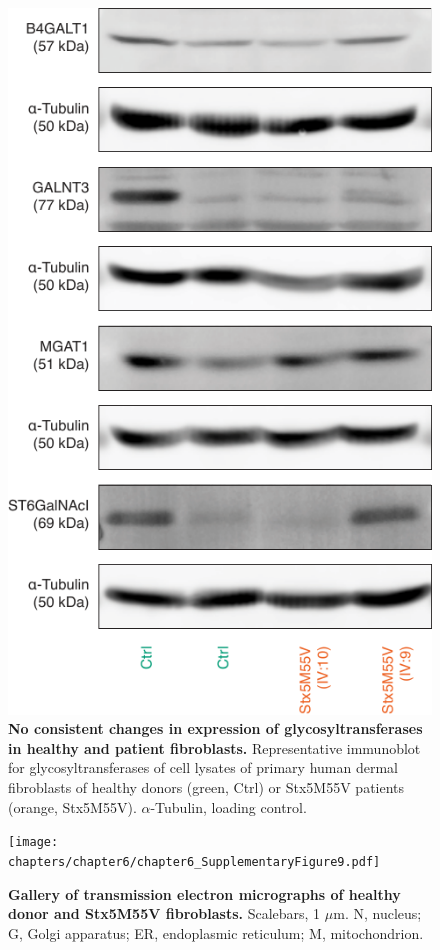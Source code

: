 \begin{figure}
    \includegraphics[keepaspectratio=true]{chapters/chapter6/chapter6_SupplementaryFigure8.pdf}
    \caption{\textbf{No consistent changes in expression of glycosyltransferases in healthy and patient fibroblasts.} Representative immunoblot for glycosyltransferases of cell lysates of primary human dermal fibroblasts of healthy donors (green, Ctrl) or Stx5M55V patients (orange, Stx5M55V). $\alpha$-Tubulin, loading control.}
    \label{fig:ch6supfig8}
\end{figure}

\clearpage

\begin{figure}
    \texttt{[image: chapters/chapter6/chapter6\_SupplementaryFigure9.pdf]}
    \caption{\textbf{Gallery of transmission electron micrographs of healthy donor and Stx5M55V fibroblasts.} Scalebars, 1 $\mu$m. N, nucleus; G, Golgi apparatus; ER, endoplasmic reticulum; M, mitochondrion.}
    \label{fig:ch6supfig9}
\end{figure}

